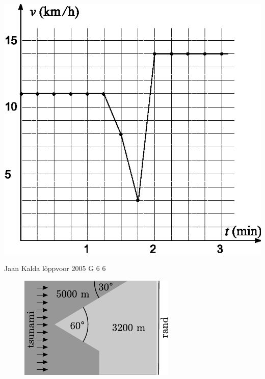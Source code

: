 \documentclass[11pt, twoside]{article}
\begin{document}
{{\begin{center}
\includegraphics{2009-v3g-05-gps.eps}
\end{center}
\fi
}

{Jaan Kalda} %
{lõppvoor} %
{2005} %
{G 6} %
{6} %
{
\ifStatement
\begin{figure}
	\begin{center}
		\vspace{-20pt}
		\includegraphics[width=\linewidth]{2005-v3g-06-yl}
	\end{center}
\end{figure}

}}
\end{document}
